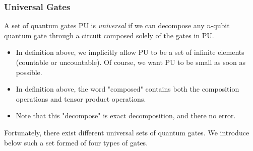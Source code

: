 \subsubsection{Universal Gates}

\begin{definition}
    A set of quantum gates PU is \textit{universal} if we can decompose any $n$-qubit quantum gate through a circuit composed solely of the gates in PU.
\end{definition}

\begin{remark}
\begin{itemize}
    \item In definition above, we implicitly allow PU to be a set of infinite elements (countable or uncountable). Of course, we want PU to be small as soon as possible.
    \item In definition above, the word "composed" contains both the composition operations and tensor product operations.
    \item Note that this "decompose" is exact decomposition, and there no error.
\end{itemize}
\end{remark}

Fortunately, there exist different universal sets of quantum gates. We introduce below such a set formed of four types of gates. 

